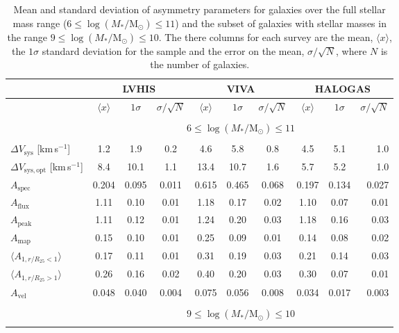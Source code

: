 \documentclass[fleqn,usenatbib]{mnras}
\begin{document}
\begin{table}
	\centering
    \caption{Mean and standard deviation of asymmetry parameters for galaxies over the full stellar mass range ($6 \leq \log(M_*/\mathrm{M}_{\odot}) \leq 11$) and the subset of galaxies with stellar masses in the range $9 \leq \log(M_*/\mathrm{M}_{\odot}) \leq 10$. The there columns for each survey are the mean, $\langle x\rangle$, the $1\sigma$ standard deviation for the sample and the error on the mean, $\sigma/\sqrt{N}$, where $N$ is the number of galaxies.}
	\label{table:param_stats_all}
	\begin{tabular}{lccccccccr}
		\hline
		& \multicolumn{3}{c}{LVHIS} & \multicolumn{3}{c}{VIVA} & \multicolumn{3}{c}{HALOGAS} \\ \hline
		& $\langle x\rangle$ & $1\sigma$ & $\sigma/\sqrt{N}$ & $\langle x\rangle$ & $1\sigma$ & $\sigma/\sqrt{N}$ & $\langle x\rangle$ & $1\sigma$ & $\sigma/\sqrt{N}$ \\ \\
		& \multicolumn{9}{c}{$6 \leq \log(M_*/\mathrm{M}_{\odot}) \leq 11$} \\ \\
		$\Delta V_{\mathrm{sys}}$ [km\,s$^{-1}$]     & 1.2 & 1.9 & 0.2 & 4.6 & 5.8 & 0.8 & 4.5 & 5.1 & 1.0 \\
		$\Delta V_{\mathrm{sys,opt}}$ [km\,s$^{-1}$] & 8.4  & 10.1 & 1.1 & 13.4 & 10.7 & 1.6 & 5.7 & 5.2 & 1.0 \\
		$A_{\mathrm{spec}}$     & 0.204 & 0.095 & 0.011 & 0.615 & 0.465 & 0.068 & 0.197 & 0.134 & 0.027 \\
		$A_{\mathrm{flux}}$     & 1.11 & 0.10 & 0.01 & 1.18 & 0.17 & 0.02 & 1.10 & 0.07 & 0.01 \\
        $A_{\mathrm{peak}}$     & 1.11 & 0.12 & 0.01 & 1.24 & 0.20 & 0.03 & 1.18 & 0.16 & 0.03 \\
        $A_{\mathrm{map}}$      & 0.15 & 0.10 & 0.01 & 0.25 & 0.09 & 0.01 & 0.14 & 0.08 & 0.02 \\
        $\langle A_{1,r/R_{25}<1}\rangle$  & 0.17 & 0.11 & 0.01 & 0.31 & 0.19 & 0.03 & 0.21 & 0.14 & 0.03 \\
        $\langle A_{1,r/R_{25}>1}\rangle$  & 0.26 & 0.16 & 0.02 & 0.40 & 0.20 & 0.03 & 0.30 & 0.07 & 0.01 \\
        $A_{\mathrm{vel}}$    & 0.048 & 0.040 & 0.004 & 0.075 & 0.056 & 0.008 & 0.034 & 0.017 & 0.003 \\ \\
        & \multicolumn{9}{c}{$9 \leq \log(M_*/\mathrm{M}_{\odot}) \leq 10$} \\ \\

\end{tabular}
\end{table}
\end{document}
